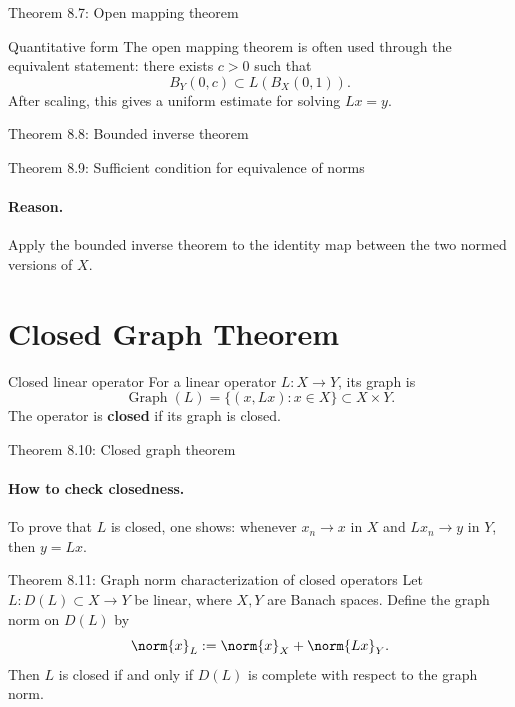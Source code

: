 \documentclass[11pt]{article}
\begin{document}
\begin{thmbox}{Theorem 8.7: Open mapping theorem}
\thmOpenMapping
\end{thmbox}

\begin{exbox}{Quantitative form}
The open mapping theorem is often used through the equivalent statement:
there exists $c>0$ such that
\[
B_Y(0,c)\subset L(B_X(0,1)).
\]
After scaling, this gives a uniform estimate for solving $Lx=y$.
\end{exbox}

\begin{thmbox}{Theorem 8.8: Bounded inverse theorem}
\thmBoundedInverse
\end{thmbox}

\begin{thmbox}{Theorem 8.9: Sufficient condition for equivalence of norms}
\thmComparableNorms
\end{thmbox}

\paragraph{Reason.}
Apply the bounded inverse theorem to the identity map between the two normed versions of $X$.

\section{Closed Graph Theorem}

\begin{defbox}{Closed linear operator}
For a linear operator $L:X\to Y$, its graph is
\[
\operatorname{Graph}(L)=\{(x,Lx):x\in X\}\subset X\times Y.
\]
The operator is \textbf{closed} if its graph is closed.
\end{defbox}

\begin{thmbox}{Theorem 8.10: Closed graph theorem}
\thmClosedGraph
\end{thmbox}

\paragraph{How to check closedness.}
To prove that $L$ is closed, one shows:
whenever $x_n\to x$ in $X$ and $Lx_n\to y$ in $Y$, then $y=Lx$.

\begin{thmbox}{Theorem 8.11: Graph norm characterization of closed operators}
Let $L:D(L)\subset X\to Y$ be linear, where $X,Y$ are Banach spaces. Define the graph norm on $D(L)$ by
\[
\norm{x}_{L}:=\norm{x}_X+\norm{Lx}_Y.
\]
Then $L$ is closed if and only if $D(L)$ is complete with respect to the graph norm.
\end{thmbox}
\end{document}
